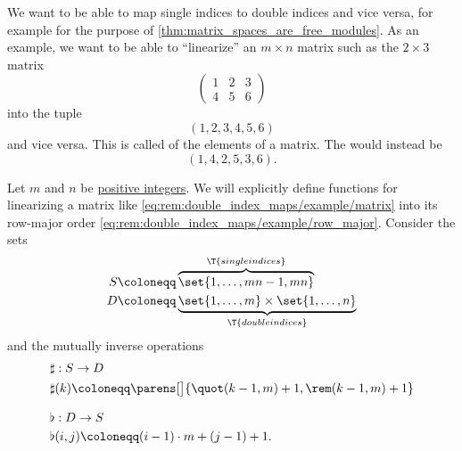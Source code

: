 \begin{remark}\label{rem:double_index_maps}
  We want to be able to map single indices to double indices and vice versa, for example for the purpose of \cref{thm:matrix_spaces_are_free_modules}. As an example, we want to be able to \enquote{linearize} an \( m \times n \) matrix such as the \( 2 \times 3 \) matrix
  \begin{equation}\label{eq:rem:double_index_maps/example/matrix}
    \begin{pmatrix}
      1 & 2 & 3 \\
      4 & 5 & 6
    \end{pmatrix}
  \end{equation}
  into the tuple
  \begin{equation}\label{eq:rem:double_index_maps/example/row_major}
    (1, 2, 3, 4, 5, 6)
  \end{equation}
  and vice versa. This is called  of the elements of a matrix. The  would instead be
  \begin{equation}\label{eq:rem:double_index_maps/example/column_major}
    (1, 4, 2, 5, 3, 6).
  \end{equation}

  Let \( m \) and \( n \) be \hyperref[def:integer_signum]{positive integers}. We will explicitly define functions for linearizing a matrix like \eqref{eq:rem:double_index_maps/example/matrix} into its row-major order \eqref{eq:rem:double_index_maps/example/row_major}. Consider the sets
  \begin{align*}
    S &\coloneqq \overbrace{ \set{ 1, \ldots, mn - 1, mn } }^{\T{single indices}}
    \\
    D &\coloneqq \underbrace{ \set{ 1, \ldots, m } \times \set{ 1, \ldots, n } }_{\T{double indices}}
  \end{align*}
  and the mutually inverse operations
  \begin{align}
    &\begin{aligned}\label{eq:rem:double_index_maps/sharp}
      &\sharp: S \to D \\
      &\sharp(k) \coloneqq \parens[\big]{ \quot(k - 1, m) + 1, \rem(k - 1, m) + 1 } \\
    \end{aligned}
    \\[0.5\baselineskip]
    &\begin{aligned}\label{eq:rem:double_index_maps/flat}
      &\flat: D \to S \\
      &\flat(i, j) \coloneqq (i - 1) \cdot m + (j - 1) + 1.
    \end{aligned}
  \end{align}


\end{remark}
